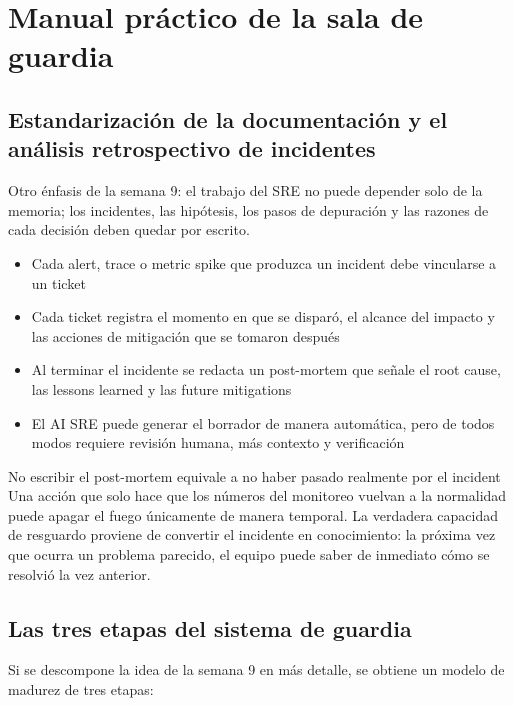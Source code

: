 \documentclass[a4paper]{article}
\begin{document}
\section{Manual práctico de la sala de guardia}

\subsection{Estandarización de la documentación y el análisis retrospectivo de incidentes}

Otro énfasis de la semana 9: el trabajo del SRE no puede depender solo de la memoria; los incidentes, las hipótesis, los pasos de depuración y las razones de cada decisión deben quedar por escrito.

\begin{itemize}
    \item Cada alert, trace o metric spike que produzca un incident debe vincularse a un ticket
    \item Cada ticket registra el momento en que se disparó, el alcance del impacto y las acciones de mitigación que se tomaron después
    \item Al terminar el incidente se redacta un post-mortem que señale el root cause, las lessons learned y las future mitigations
    \item El AI SRE puede generar el borrador de manera automática, pero de todos modos requiere revisión humana, más contexto y verificación
\end{itemize}

\begin{warningbox}{No escribir el post-mortem equivale a no haber pasado realmente por el incident}
Una acción que solo hace que los números del monitoreo vuelvan a la normalidad puede apagar el fuego únicamente de manera temporal. La verdadera capacidad de resguardo proviene de convertir el incidente en conocimiento: la próxima vez que ocurra un problema parecido, el equipo puede saber de inmediato cómo se resolvió la vez anterior.
\end{warningbox}

\subsection{Las tres etapas del sistema de guardia}

Si se descompone la idea de la semana 9 en más detalle, se obtiene un modelo de madurez de tres etapas:
\end{document}
